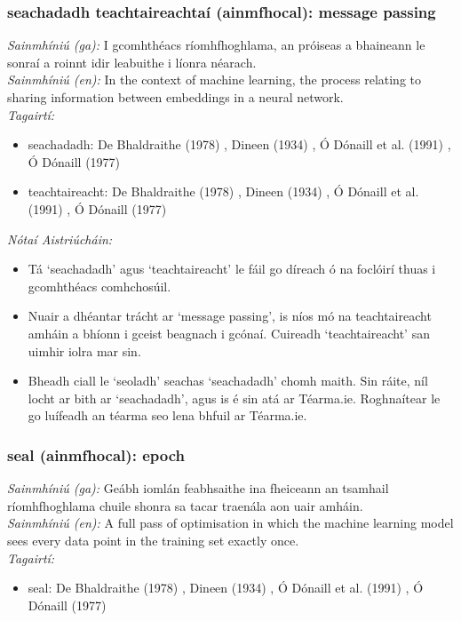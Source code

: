 \subsubsection*{seachadadh teachtaireachtaí (ainmfhocal): message passing}
 \noindent \textit{Sainmhíniú (ga):} I gcomhthéacs ríomhfhoghlama, an próiseas a bhaineann le sonraí a roinnt idir leabuithe i líonra néarach.
\\
 \noindent \textit{Sainmhíniú (en):} In the context of machine learning, the process relating to sharing information between embeddings in a neural network.
\\
 \noindent \textit{Tagairtí:}
\begin{itemize}
	\item seachadadh: De Bhaldraithe (1978) \cite{de-bhaldraithe}, Dineen (1934) \cite{dineen}, Ó Dónaill et al. (1991) \cite{focloir-beag}, Ó Dónaill (1977) \cite{odonaill}
	\item teachtaireacht: De Bhaldraithe (1978) \cite{de-bhaldraithe}, Dineen (1934) \cite{dineen}, Ó Dónaill et al. (1991) \cite{focloir-beag}, Ó Dónaill (1977) \cite{odonaill}
\end{itemize}

 \noindent \textit{Nótaí Aistriúcháin:}
\begin{itemize}
	\item Tá `seachadadh' agus `teachtaireacht' le fáil go díreach ó na foclóirí thuas i gcomhthéacs comhchosúil.
	\item Nuair a dhéantar trácht ar `message passing', is níos mó na teachtaireacht amháin a bhíonn i gceist beagnach i gcónaí. Cuireadh `teachtaireacht' san uimhir iolra mar sin.
	\item Bheadh ciall le `seoladh' seachas `seachadadh' chomh maith. Sin ráite, níl locht ar bith ar `seachadadh', agus is é sin atá ar Téarma.ie. Roghnaítear le go luífeadh an téarma seo lena bhfuil ar Téarma.ie.
\end{itemize}


\subsubsection*{seal (ainmfhocal): epoch}
 \noindent \textit{Sainmhíniú (ga):}  Geábh iomlán feabhsaithe ina fheiceann an tsamhail ríomhfhoghlama chuile shonra sa tacar traenála aon uair amháin.
\\
 \noindent \textit{Sainmhíniú (en):} A full pass of optimisation in which the machine learning model sees every data point in the training set exactly once.
\\
 \noindent \textit{Tagairtí:}
\begin{itemize}
	\item seal: De Bhaldraithe (1978) \cite{de-bhaldraithe}, Dineen (1934) \cite{dineen}, Ó Dónaill et al. (1991) \cite{focloir-beag}, Ó Dónaill (1977) \cite{odonaill}
\end{itemize}

